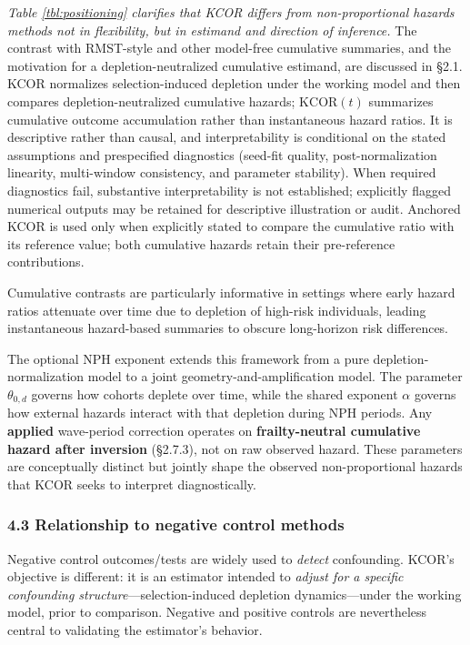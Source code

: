 \documentclass[
]{article}
\begin{document}
\emph{Table \ref{tbl:positioning} clarifies that KCOR differs from non-proportional hazards methods not in flexibility, but in estimand and direction of inference.} The contrast with RMST-style and other model-free cumulative summaries, and the motivation for a depletion-neutralized cumulative estimand, are discussed in §2.1. KCOR normalizes selection-induced depletion under the working model and then compares depletion-neutralized cumulative hazards; \(\mathrm{KCOR}(t)\) summarizes cumulative outcome accumulation rather than instantaneous hazard ratios. It is descriptive rather than causal, and interpretability is conditional on the stated assumptions and prespecified diagnostics (seed-fit quality, post-normalization linearity, multi-window consistency, and parameter stability). When required diagnostics fail, substantive interpretability is not established; explicitly flagged numerical outputs may be retained for descriptive illustration or audit. Anchored KCOR is used only when explicitly stated to compare the cumulative ratio with its reference value; both cumulative hazards retain their pre-reference contributions.

Cumulative contrasts are particularly informative in settings where early hazard ratios attenuate over time due to depletion of high-risk individuals, leading instantaneous hazard-based summaries to obscure long-horizon risk differences.

The optional NPH exponent extends this framework from a pure depletion-normalization model to a joint geometry-and-amplification model. The parameter \(\theta_{0,d}\) governs how cohorts deplete over time, while the shared exponent \(\alpha\) governs how external hazards interact with that depletion during NPH periods. Any \textbf{applied} wave-period correction operates on \textbf{frailty-neutral cumulative hazard after inversion} (§2.7.3), not on raw observed hazard. These parameters are conceptually distinct but jointly shape the observed non-proportional hazards that KCOR seeks to interpret diagnostically.

\subsubsection{4.3 Relationship to negative control methods}\label{relationship-to-negative-control-methods}

Negative control outcomes/tests are widely used to \emph{detect} confounding. KCOR's objective is different: it is an estimator intended to \emph{adjust for a specific confounding structure}---selection-induced depletion dynamics---under the working model, prior to comparison. Negative and positive controls are nevertheless central to validating the estimator's behavior.
\end{document}
